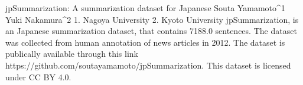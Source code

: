 
jpSummarization: A summarization dataset for Japanese
Souta Yamamoto^1 Yuki Nakamura^2
1. Nagoya University 2. Kyoto University
jpSummarization, is an Japanese summarization dataset, that contains 7188.0 sentences.
The dataset was collected from human annotation of news articles in 2012. 
The dataset is publically available through this link https://github.com/soutayamamoto/jpSummarization. This dataset is licensed under CC BY 4.0.

